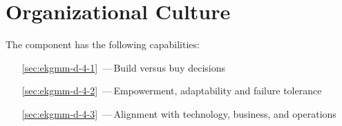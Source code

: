 \chapter{Organizational Culture}\label{ch:ekg-mm-d-4}

The  component has the following capabilities:

\begin{itemize}[leftmargin=.5in]
  \item [\ref{sec:ekgmm-d-4-1}] \,---\,Build versus buy decisions
  \item [\ref{sec:ekgmm-d-4-2}] \,---\,Empowerment, adaptability and failure tolerance
  \item [\ref{sec:ekgmm-d-4-3}] \,---\,Alignment with technology, business, and operations
\end{itemize}





